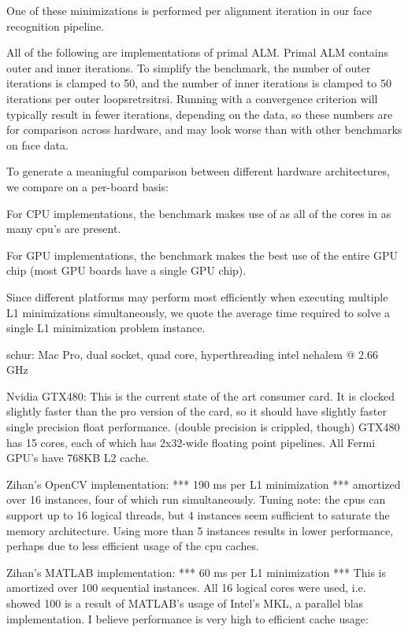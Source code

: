 \documentclass[10pt,twocolumn,letterpaper]{article}
\begin{document}
One of these minimizations is performed per 
alignment iteration in our face recognition pipeline.

All of the following are implementations of primal ALM.
Primal ALM contains outer and inner iterations.
To simplify the benchmark, the number of outer iterations
is clamped to 50, and the number of inner iterations is
clamped to 50 iterations per outer loopsretrsitrsi.  Running with
a convergence criterion will typically result in fewer
iterations, depending on the data, so these numbers are
for comparison across hardware, and may look worse than
with other benchmarks on face data.

To generate a meaningful comparison between different hardware
architectures, we compare on a per-board basis:

For CPU implementations, the benchmark makes use of
as all of the cores in as many cpu's are present.

For GPU implementations, the benchmark makes the best use
of the entire GPU chip (most GPU boards have a single GPU chip).

Since different platforms may perform most efficiently when
executing multiple L1 minimizations simultaneously,
we quote the average time required to solve a single L1
minimization problem instance.

schur:  Mac Pro, dual socket, quad core, hyperthreading intel nehalem @ 2.66 GHz

Nvidia GTX480: This is the current state of the art consumer card.  
It is clocked slightly faster than the pro version of the card, so it 
should have slightly faster single precision float performance. (double precision is crippled, though)
GTX480 has 15 cores, each of which has 2x32-wide floating point pipelines.
All Fermi GPU's have 768KB L2 cache.

Zihan's OpenCV implementation: *** 190 ms per L1 minimization ***
amortized over 16 instances,
four of which run simultaneously.  Tuning note:  the cpus
can support up to 16 logical threads, but 4 instances seem
sufficient to saturate the memory architecture.  Using more
than 5 instances results in lower performance, perhaps due
to less efficient usage of the cpu caches.

Zihan's MATLAB implementation: *** 60 ms per L1 minimization ***
This is amortized over 100 sequential instances.  All 16 logical
cores were used, i.e. showed 100%
is a result of MATLAB's usage of Intel's MKL, a parallel blas
implementation. I believe performance is very high to
efficient cache usage:
\end{document}
